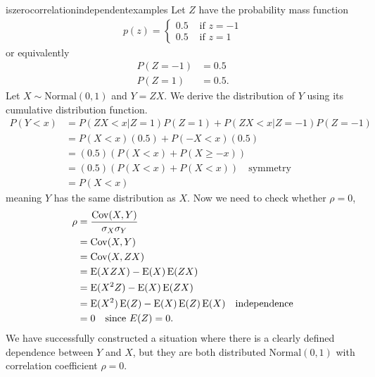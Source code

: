 \begin{subanswer}{iszerocorrelationindependentexamples}
Let $Z$ have the probability mass function
\begin{align*}
p(z) =
\begin{cases}
  0.5 & \text{ if } z = -1 \\
  0.5 & \text{ if } z = 1
\end{cases}
\end{align*}
or equivalently
\begin{align*}
P(Z = -1) &= 0.5  \\
P(Z =  1) &= 0.5
\text{.}
\end{align*}
Let $X \sim \text{Normal}(0,1)$
and
$Y = ZX$.
We derive the distribution of $Y$ using its cumulative distribution function.
\begin{align*}
P(Y<x) &=
P( ZX<x| Z = 1)P(Z=1) +
P( ZX<x| Z = -1)P(Z=-1) \\
&=
P( X<x)(0.5) + P(-X<x)(0.5) \\
&=  (0.5)( P( X<x) + P(X \geq -x)) \\
&=  (0.5)( P( X<x) + P(X < x)) \quad \text{symmetry} \\
&=   P(X < x)
\end{align*}
meaning $Y$ has the same distribution as $X$.
Now we need to check whether $\rho=0$,
\begin{align*}
\rho
&= \frac{\operatorname{\mathrm{Cov}}(X,Y)}{\sigma_X \sigma_Y}  \\
&= \operatorname{\mathrm{Cov}}(X,Y) \\
&= \operatorname{\mathrm{Cov}}(X, ZX) \\
&= \operatorname{\mathrm{E}}(XZX) - \operatorname{\mathrm{E}}(X) \operatorname{\mathrm{E}}(ZX)  \\
&= \operatorname{\mathrm{E}}(X^2 Z) - \operatorname{\mathrm{E}}(X) \operatorname{\mathrm{E}}(ZX)  \\
&= \operatorname{\mathrm{E}}(X^2) \operatorname{\mathrm{E}}(Z) - \operatorname{\mathrm{E}}(X)\operatorname{\mathrm{E}}(Z)\operatorname{\mathrm{E}}(X)   \quad \text{independence} \\
&=  0                                \quad \text{since } E(Z)=0
\text{.}
\end{align*}
We have successfully constructed a situation where
there is a clearly defined dependence between $Y$ and $X$, but
they are both distributed $\text{Normal}(0,1)$ with correlation coefficient
$\rho = 0$.
\end{subanswer}
